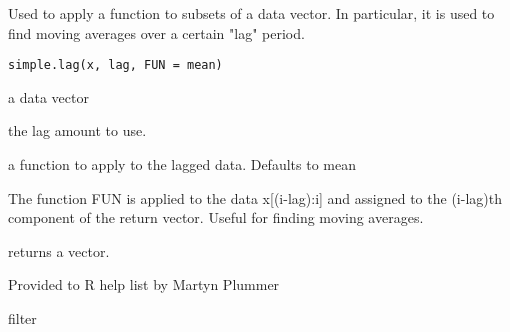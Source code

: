 \begin{Description}\relax
Used to apply a function to subsets of a data vector. In particular,
it is used to find moving averages over a certain "lag" period.
\end{Description}
\begin{Usage}
\begin{verbatim}
simple.lag(x, lag, FUN = mean)
\end{verbatim}
\end{Usage}
\begin{Arguments}
\begin{ldescription}
\item[\code{x}] a data vector 
\item[\code{lag}] the lag amount to use. 
\item[\code{FUN}] a function to apply to the lagged data. Defaults to mean 
\end{ldescription}
\end{Arguments}
\begin{Details}\relax
The function FUN is applied to the data x[(i-lag):i] and assigned to
the (i-lag)th component of the return vector. Useful for finding
moving averages.
\end{Details}
\begin{Value}
returns a vector.
\end{Value}
\begin{Author}\relax
Provided to R help list by Martyn Plummer
\end{Author}
\begin{SeeAlso}\relax
filter
\end{SeeAlso}
\begin{Examples}
\end{Examples}

